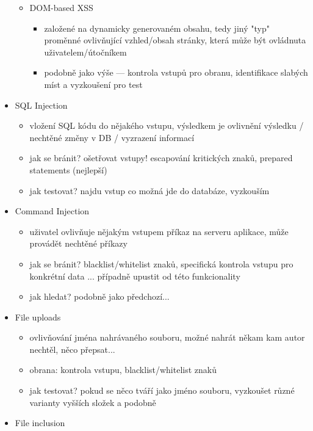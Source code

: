 \begin{itemize}
\begin{itemize}
\begin{itemize}
        \end{itemize}
        \item DOM-based XSS
        \begin{itemize}
            \item založené na dynamicky generovaném obsahu, tedy jiný "typ" proměnné ovlivňující vzhled/obsah stránky, která může být ovládnuta uživatelem/útočníkem
            \item podobně jako výše --- kontrola vstupů pro obranu, identifikace slabých míst a vyzkoušení pro test
        \end{itemize}
    \end{itemize}
    \item SQL Injection
    \begin{itemize}
        \item vložení SQL kódu do nějakého vstupu, výsledkem je ovlivnění výsledku / nechtěné změny v DB / vyzrazení informací
        \item jak se bránit? ošetřovat vstupy! escapování kritických znaků, prepared statements (nejlepší)
        \item jak testovat? najdu vstup co možná jde do databáze, vyzkouším
    \end{itemize}
    \item Command Injection
    \begin{itemize}
        \item uživatel ovlivňuje nějakým vstupem příkaz na serveru aplikace, může provádět nechtěné příkazy
        \item jak se bránit? blacklist/whitelist znaků, specifická kontrola vstupu pro konkrétní data ... případně upustit od této funkcionality
        \item jak hledat? podobně jako předchozí...
    \end{itemize}
    \item File uploads
    \begin{itemize}
        \item ovlivňování jména nahrávaného souboru, možné nahrát někam kam autor nechtěl, něco přepsat...
        \item obrana: kontrola vstupu, blacklist/whitelist znaků
        \item jak testovat? pokud se něco tváří jako jméno souboru, vyzkoušet různé varianty vyšších složek a podobně
    \end{itemize}
    \item File inclusion
    \begin{itemize}

\end{itemize}
\end{itemize}
